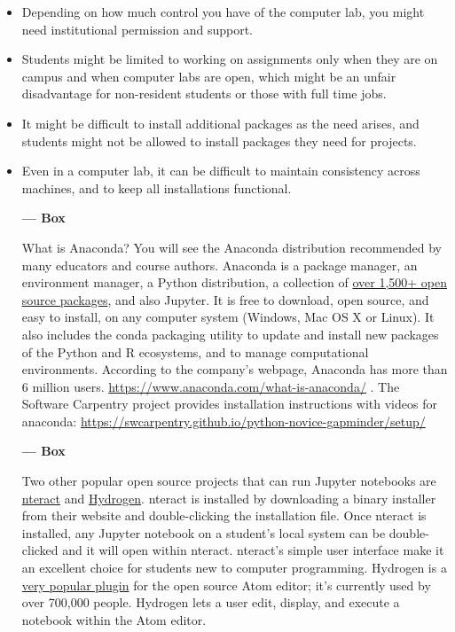 \documentclass[]{book}
\begin{document}
\begin{itemize}
\item
  Depending on how much control you have of the computer lab, you might
  need institutional permission and support.
\item
  Students might be limited to working on assignments only when they are
  on campus and when computer labs are open, which might be an unfair
  disadvantage for non-resident students or those with full time jobs.
\item
  It might be difficult to install additional packages as the need
  arises, and students might not be allowed to install packages they
  need for projects.
\item
  Even in a computer lab, it can be difficult to maintain consistency
  across machines, and to keep all installations functional.

  \textbf{--- Box}

  What is Anaconda? You will see the Anaconda distribution recommended
  by many educators and course authors. Anaconda is a package manager,
  an environment manager, a Python distribution, a collection of
  \href{https://docs.anaconda.com/anaconda/packages/pkg-docs/}{over
  1,500+ open source packages}, and also Jupyter. It is free to
  download, open source, and easy to install, on any computer system
  (Windows, Mac OS X or Linux). It also includes the conda packaging
  utility to update and install new packages of the Python and R
  ecosystems, and to manage computational environments. According to the
  company's webpage, Anaconda has more than 6 million users.
  \url{https://www.anaconda.com/what-is-anaconda/} . The Software
  Carpentry project provides installation instructions with videos for
  anaconda:
  \url{https://swcarpentry.github.io/python-novice-gapminder/setup/}

  \textbf{--- Box}

  Two other popular open source projects that can run Jupyter notebooks
  are \href{https://nteract.io/}{nteract} and
  \href{https://nteract.io/atom}{Hydrogen}. nteract is installed by
  downloading a binary installer from their website and double-clicking
  the installation file. Once nteract is installed, any Jupyter notebook
  on a student's local system can be double-clicked and it will open
  within nteract. nteract's simple user interface make it an excellent
  choice for students new to computer programming. Hydrogen is a
  \href{https://atom.io/packages/hydrogen}{very popular plugin} for the
  open source Atom editor; it's currently used by over 700,000 people.
  Hydrogen lets a user edit, display, and execute a notebook within the
  Atom editor.
\end{itemize}
\end{document}
